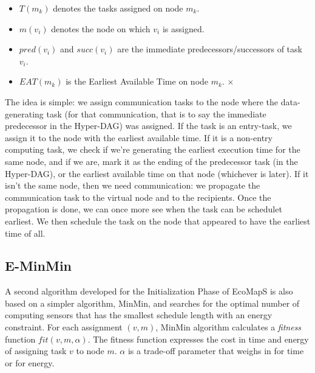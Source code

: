 \begin{itemize}
\item $T(m_k)$ denotes the tasks assigned on node $m_k$.
\item $m(v_i)$ denotes the node on which $v_i$ is assigned.
\item $pred(v_i)$ and $succ(v_i)$ are the immediate predecessors/successors of task $v_i$.
\item $EAT(m_k)$ is the Earliest Available Time on node $m_k$.
 ×
\end{itemize}

The idea is simple: we assign communication tasks to the node where the data-generating task (for that communication, that is to say the immediate predecessor
in the Hyper-DAG) was assigned. If the task is an entry-task, we assign it to the node with the earliest available time. If it is a non-entry computing task,
we check if we're generating the earliest execution time for the same node, and if we are, mark it as the ending of the predecessor task (in the Hyper-DAG), or
the earliest available time on that node (whichever is later). If it isn't the same node, then we need communication: we propagate the communication task to the 
virtual node and to the recipients. Once the propagation is done, we can once more see when the task can be schedulet earliest. We then schedule the task on the node
that appeared to have the earliest time of all. 


\subsection{E-MinMin}

A second algorithm developed for the Initialization Phase of EcoMapS is also based on a simpler algorithm, MinMin, and searches for the optimal number of computing 
sensors that has the smallest schedule length with an energy constraint. For each assignment $(v,m)$, MinMin algorithm calculates a \textit{fitness} function $fit(v,m,\alpha)$.
The fitness function expresses the cost in time and energy of assigning task $v$ to node $m$. $\alpha$ is a trade-off parameter that weighs in for time or for energy.


